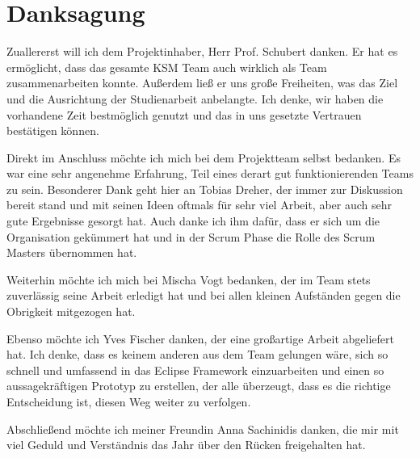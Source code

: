 \section{Danksagung}

Zuallererst will ich dem Projektinhaber, Herr Prof. Schubert danken. Er hat es ermöglicht, dass das gesamte KSM Team auch wirklich als Team zusammenarbeiten konnte. Außerdem ließ er uns große Freiheiten, was das Ziel und die Ausrichtung der Studienarbeit anbelangte. Ich denke, wir haben die vorhandene Zeit bestmöglich genutzt und das in uns gesetzte Vertrauen bestätigen können. 

Direkt im Anschluss möchte ich mich bei dem Projektteam selbst bedanken. Es war eine sehr angenehme Erfahrung, Teil eines derart gut funktionierenden Teams zu sein. Besonderer Dank geht hier an Tobias Dreher, der immer zur Diskussion bereit stand und mit seinen Ideen oftmals für sehr viel Arbeit, aber auch sehr gute Ergebnisse gesorgt hat. Auch danke ich ihm dafür, dass er sich um die Organisation gekümmert hat und in der Scrum Phase die Rolle des Scrum Masters übernommen hat.

Weiterhin möchte ich mich bei Mischa Vogt bedanken, der im Team stets zuverlässig seine Arbeit erledigt hat und bei allen kleinen Aufständen gegen die Obrigkeit mitgezogen hat.

Ebenso möchte ich Yves Fischer danken, der eine großartige Arbeit abgeliefert hat. Ich denke, dass es keinem anderen aus dem Team gelungen wäre, sich so schnell und umfassend in das Eclipse Framework einzuarbeiten und einen so aussagekräftigen Prototyp zu erstellen, der alle überzeugt, dass es die richtige Entscheidung ist, diesen Weg weiter zu verfolgen.

Abschließend möchte ich meiner Freundin Anna Sachinidis danken, die mir mit viel Geduld und Verständnis das Jahr über den Rücken freigehalten hat.